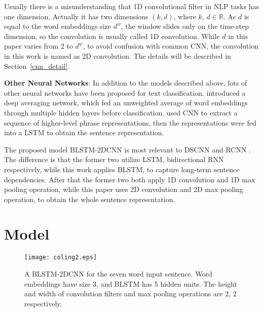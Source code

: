 \documentclass[11pt]{article}
\begin{document}
Usually there is a misunderstanding that 1D convolutional filter in NLP tasks has one dimension. Actually it has two dimensions $(k, d)$, where $k$, $d \in \mathbb{R}$. As $d$ is equal to the word embeddings size $d^w$, the window slides only on the time-step dimension, so the convolution is usually called 1D convolution. While $d$ in this paper varies from 2 to $d^w$, to avoid confusion with common CNN, the convolution in this work is named as 2D convolution. The details will be described in Section~\ref{cnn_detail}.









\textbf{Other Neural Networks}: In addition to the models described above, lots of other neural networks have been proposed for text classification.  introduced a deep averaging network, which fed an unweighted average of word embeddings through multiple hidden layers before classification.  used CNN to extract a sequence of higher-level phrase representations, then the representations were fed into a LSTM to obtain the sentence representation.






The proposed model BLSTM-2DCNN is most relevant to DSCNN \cite{zhang2016dependency} and RCNN \cite{wen2016learning}. The difference is that the former two utilize LSTM, bidirectional RNN respectively, while this work applies BLSTM, to capture long-term sentence dependencies. After that the former two both apply 1D convolution and 1D max pooling operation, while this paper uses 2D convolution and 2D max pooling operation, to obtain the whole sentence representation.




\section{Model}

\begin{figure*}[t]
    \centering
    \texttt{[image: coling2.eps]}
    \caption{A BLSTM-2DCNN for the seven word input sentence. Word embeddings have size 3, and BLSTM has 5 hidden units. The height and width of convolution filters and max pooling operations are 2, 2 respectively.}
\end{figure*}
\end{document}

